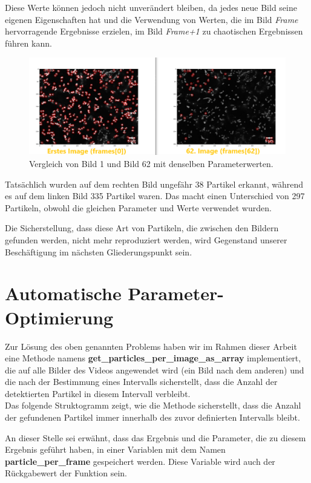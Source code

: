 Diese Werte können jedoch nicht unverändert bleiben, da jedes neue Bild seine eigenen Eigenschaften hat und die Verwendung von Werten, die im Bild \textit{Frame} hervorragende Ergebnisse erzielen, im Bild \textit{Frame+1} zu chaotischen Ergebnissen führen kann.

\begin{figure}[H]
    \centering
    \includegraphics[scale=0.37]{Grafiken/trackpyBilder/comparison_0_Vs_62.png}
    \caption{Vergleich von Bild 1 und Bild 62 mit denselben Parameterwerten.}
    \label{fig:kap3_comp_Bild_1vs_62}
\end{figure}

Tatsächlich wurden auf dem rechten Bild ungefähr 38 Partikel erkannt, während es auf dem linken Bild 335 Partikel waren. Das macht einen Unterschied von 297 Partikeln, obwohl die gleichen Parameter und Werte verwendet wurden.

Die Sicherstellung, dass diese Art von Partikeln, die zwischen den Bildern gefunden werden, nicht mehr reproduziert werden, wird Gegenstand unserer Beschäftigung im nächsten Gliederungspunkt sein.

\section{Automatische Parameter-Optimierung}
Zur Lösung des oben genannten Problems haben wir im Rahmen dieser Arbeit eine Methode namens \textbf{get\_particles\_per\_image\_as\_array} implementiert, die auf alle Bilder des Videos angewendet wird (ein Bild nach dem anderen) und die nach der Bestimmung eines Intervalls sicherstellt, dass die Anzahl der detektierten Partikel in diesem Intervall verbleibt.\\

Das folgende Struktogramm zeigt, wie die Methode sicherstellt, dass die Anzahl der gefundenen Partikel immer innerhalb des zuvor definierten Intervalls bleibt.

An dieser Stelle sei erwähnt, dass das Ergebnis und die Parameter, die zu diesem Ergebnis geführt haben, in einer Variablen mit dem Namen \textbf{particle\_per\_frame} gespeichert werden.  Diese Variable wird auch der Rückgabewert der Funktion sein. 

